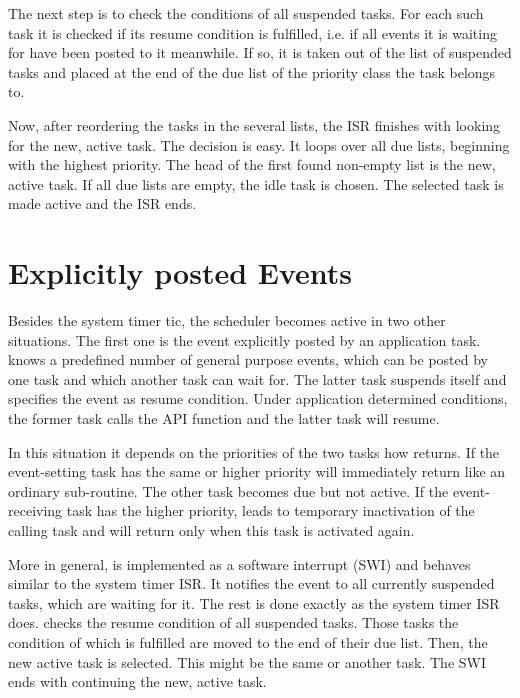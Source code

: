 The next step is to check the conditions of all suspended tasks. For each
such task it is checked if its resume condition is fulfilled, i.e. if all
events it is waiting for have been posted to it meanwhile. If so, it is
taken out of the list of suspended tasks and placed at the end of the due
list of the priority class the task belongs to.

Now, after reordering the tasks in the several lists, the ISR finishes
with looking for the new, active task. The decision is easy. It loops
over all due lists, beginning with the highest priority. The head of the
first found non-empty list is the new, active task. If all due lists are
empty, the idle task is chosen. The selected task is made active and the
ISR ends.


\section{Explicitly posted Events}
\label{secManualEvents}

Besides the system timer tic, the scheduler becomes active in two other
situations. The first one is the event explicitly posted by an application
task. \rtos{} knows a predefined number of general purpose events, which
can be posted by one task and which another task can wait for. The latter
task suspends itself and specifies the event as resume condition. Under
application determined conditions, the
former task calls the \rtos{} API function  and the latter
task will resume. 

In this situation it depends on the priorities of the two tasks how
 returns. If the event-setting task has the same or higher
priority  will immediately return like an ordinary
sub-routine. The other task becomes due but not active. If the
event-receiving task has the higher priority,  leads to
temporary inactivation of the calling task and will return only when this
task is activated again.

More in general,  is implemented as a software interrupt
(SWI) and behaves similar to the system timer ISR. It notifies the event
to all currently suspended tasks, which are waiting for it. The rest is
done exactly as the system timer ISR does.  checks the
resume condition of all suspended tasks. Those tasks the condition of
which is fulfilled are moved to the end of their due list. Then, the new
active task is selected. This might be the same or another task. The SWI
ends with continuing the new, active task.

